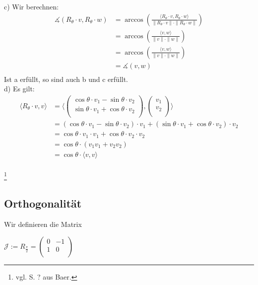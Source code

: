 \documentclass{article}
\begin{document}
c) Wir berechnen: \\
\begin{align*}
    \measuredangle (R_\theta \cdot v, R_\theta \cdot w) &= \arccos \left( \frac{\langle R_\theta \cdot v, R_\theta \cdot w \rangle}{\|R_\theta \cdot v\| \cdot \|R_\theta \cdot w\|} \right) \\
    &= \arccos \left( \frac{\langle v,w \rangle}{\|v\| \cdot \|w\|} \right) \\
    &= \arccos \left( \frac{\langle v,w \rangle}{\|v\| \cdot \|w\|} \right) \\
    &= \measuredangle (v,w) \\
\end{align*}
Ist a erfüllt, so sind auch b und c erfüllt. \\
d) Es gilt: \\
\begin{align*}
    \langle R_\theta \cdot v, v \rangle &= \langle \begin{pmatrix}
        \cos \theta \cdot v_1 - \sin \theta \cdot v_2 \\
        \sin \theta \cdot v_1 + \cos \theta \cdot v_2 \\
    \end{pmatrix}, \begin{pmatrix}
        v_1 \\
        v_2 \\
    \end{pmatrix} \rangle \\
    &= (\cos \theta \cdot v_1 - \sin \theta \cdot v_2) \cdot v_1 + (\sin \theta \cdot v_1 + \cos \theta \cdot v_2) \cdot v_2 \\
    &= \cos \theta \cdot v_1 \cdot v_1 + \cos \theta \cdot v_2 \cdot v_2 \\
    &= \cos \theta \cdot (v_1 v_1 + v_2 v_2) \\
    &= \cos \theta \cdot \langle v,v \rangle \\
\end{align*}

\date{Donnerstag, 07.12.23} \footnote{vgl. S. ? aus Baer.}
\subsection{Orthogonalität}
Wir definieren die Matrix \\
\begin{center}
    $\mathcal{J} := R_{\frac{\pi}{2}} = \begin{pmatrix}
        0 & -1 \\
        1 & 0 \\
    \end{pmatrix}$
\end{center}
\end{document}
